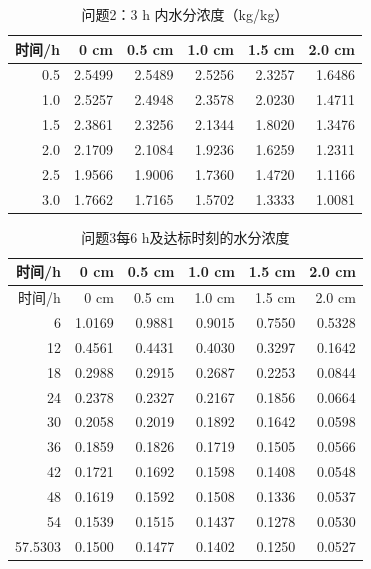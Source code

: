 \begin{table}[H]
\centering
\caption{问题2：3 h 内水分浓度（kg/kg）}\label{tab:q2c}
\small
\begin{tabular}{rrrrrr}
\toprule
时间/h & 0 cm & 0.5 cm & 1.0 cm & 1.5 cm & 2.0 cm \\
\midrule
0.5 & 2.5499 & 2.5489 & 2.5256 & 2.3257 & 1.6486 \\
1.0 & 2.5257 & 2.4948 & 2.3578 & 2.0230 & 1.4711 \\
1.5 & 2.3861 & 2.3256 & 2.1344 & 1.8020 & 1.3476 \\
2.0 & 2.1709 & 2.1084 & 1.9236 & 1.6259 & 1.2311 \\
2.5 & 1.9566 & 1.9006 & 1.7360 & 1.4720 & 1.1166 \\
3.0 & 1.7662 & 1.7165 & 1.5702 & 1.3333 & 1.0081 \\
\bottomrule
\end{tabular}
\end{table}

\begin{longtable}{rrrrrr}
\caption{问题3每6 h及达标时刻的水分浓度}\label{tab:q3}\\
\toprule
时间/h & 0 cm & 0.5 cm & 1.0 cm & 1.5 cm & 2.0 cm \\
\midrule
\endfirsthead
\toprule
时间/h & 0 cm & 0.5 cm & 1.0 cm & 1.5 cm & 2.0 cm \\
\midrule
\endhead
6 & 1.0169 & 0.9881 & 0.9015 & 0.7550 & 0.5328 \\
12 & 0.4561 & 0.4431 & 0.4030 & 0.3297 & 0.1642 \\
18 & 0.2988 & 0.2915 & 0.2687 & 0.2253 & 0.0844 \\
24 & 0.2378 & 0.2327 & 0.2167 & 0.1856 & 0.0664 \\
30 & 0.2058 & 0.2019 & 0.1892 & 0.1642 & 0.0598 \\
36 & 0.1859 & 0.1826 & 0.1719 & 0.1505 & 0.0566 \\
42 & 0.1721 & 0.1692 & 0.1598 & 0.1408 & 0.0548 \\
48 & 0.1619 & 0.1592 & 0.1508 & 0.1336 & 0.0537 \\
54 & 0.1539 & 0.1515 & 0.1437 & 0.1278 & 0.0530 \\
57.5303 & 0.1500 & 0.1477 & 0.1402 & 0.1250 & 0.0527 \\
\bottomrule
\end{longtable}

